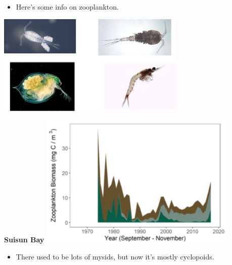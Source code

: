 \documentclass[]{article}\usepackage[]{graphicx}\usepackage[]{color}
\begin{document}
\vspace{1cm}

\begin{Row}
  \begin{Cell}{7}
    \begin{center}
      \begin{itemize}[leftmargin=1cm,rightmargin=1cm]
        \item Here's some info on zooplankton.
      \end{itemize}
      \vspace{0.5cm}
      \includegraphics[width=9cm,align=m]{figures/zoop/zoop_photos.png}
    \end{center}
  \end{Cell}
  \begin{Cell}{6}
    \begin{center}
      {\bf {\large Suisun Bay}}
      \includegraphics[width=9.5cm,align=m]{figures/zoop/zoop_suisun_bay_tmp.png}
      \vspace{0.5cm}
      \begin{itemize}[leftmargin=2cm,rightmargin=0.5cm]
        \item There used to be lots of mysids, but now it's mostly cyclopoids.
      \end{itemize}
    \end{center}
  \end{Cell}
\end{Row}
\end{document}
